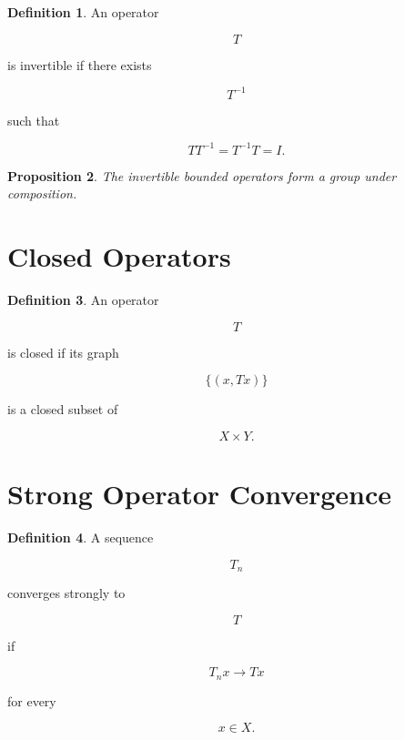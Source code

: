 \documentclass[11pt]{book}
\numberwithin{equation}{chapter}
\theoremstyle{definition}
\newtheorem{definition}{Definition}[chapter]
\theoremstyle{plain}
\newtheorem{proposition}[definition]{Proposition}
\begin{document}
\begin{definition}

An operator

\[
T
\]

is invertible if there exists

\[
T^{-1}
\]

such that

\[
TT^{-1}
=
T^{-1}T
=
I.
\]

\end{definition}


\begin{proposition}

The invertible bounded operators form a group under composition.

\end{proposition}


\section{Closed Operators}

\begin{definition}

An operator

\[
T
\]

is closed if its graph

\[
\{
(x,Tx)
\}
\]

is a closed subset of

\[
X\times Y.
\]

\end{definition}


\section{Strong Operator Convergence}

\begin{definition}

A sequence

\[
T_n
\]

converges strongly to

\[
T
\]

if

\[
T_nx
\rightarrow
Tx
\]

for every

\[
x\in X.
\]

\end{definition}
\end{document}
